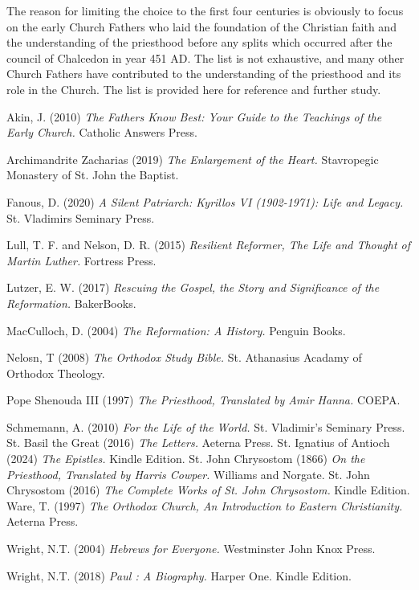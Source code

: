 \documentclass[12pt, doc]{apa7}   	%
\begin{document}
The reason for limiting the choice to the first four centuries is obviously to focus on the early Church Fathers who laid the foundation of the Christian faith and the understanding of the priesthood before any splits which occurred after the  council of Chalcedon in year 451 AD.  The list is not exhaustive, and many other Church Fathers have contributed to the understanding of the priesthood and its role in the Church.  The list is provided here for reference and further study.

\begin{thebibliography}{15}

Akin, J. (2010) \emph{The Fathers Know Best: Your Guide to the Teachings of the Early Church.} Catholic Answers Press.
    
Archimandrite Zacharias (2019) \emph{The Enlargement of the Heart.} Stavropegic Monastery of St. John the Baptist.

Fanous, D. (2020) \emph{A Silent Patriarch: Kyrillos VI (1902-1971): Life and Legacy.} St. Vladimirs Seminary Press.

Lull, T. F. and Nelson, D. R. (2015) \emph{Resilient Reformer, The Life and Thought of Martin Luther.} Fortress Press.

Lutzer, E. W. (2017) \emph{Rescuing the Gospel, the Story and Significance of the Reformation.} BakerBooks.

MacCulloch, D. (2004) \emph{The Reformation: A History.} Penguin Books.

Nelosn, T (2008) \emph{The Orthodox Study Bible.} St. Athanasius Acadamy of Orthodox Theology.

Pope Shenouda III (1997) \emph{The Priesthood, Translated by Amir Hanna.} COEPA. 

Schmemann, A. (2010) \emph{For the Life of the World.} St. Vladimir's Seminary Press.
St. Basil the Great (2016) \emph{The Letters.} Aeterna Press.
St. Ignatius of Antioch (2024) \emph{The Epistles.} Kindle Edition.
St. John Chrysostom  (1866) \emph{On the Priesthood, Translated by Harris Cowper.}  Williams and Norgate. 
St. John Chrysostom  (2016) \emph{The Complete Works of St. John Chrysostom.}  Kindle Edition. 
Ware, T. (1997) \emph{The Orthodox Church, An Introduction to Eastern Christianity.} Aeterna Press.

Wright, N.T. (2004) \emph{Hebrews for Everyone.} Westminster John Knox Press.


Wright, N.T. (2018) \emph{Paul : A Biography.} Harper One.  Kindle Edition.


\end{thebibliography}
\end{document}
